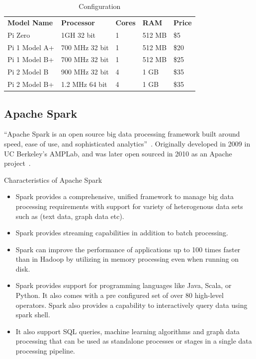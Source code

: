 \begin{table}[]
	\centering \caption{Configuration}\label{t:Different Pi Models}
        \begin{tabular}{lllll} 
        \textbf{Model Name} & \textbf{Processor} 
        & \textbf{Cores} & \textbf{RAM}& \textbf{Price}
        \\ Pi Zero & 1GH 32 bit & 1 & 512 MB & \$5
        \\ Pi 1 Model A+ & 700 MHz 32 bit & 1  & 512 MB & \$20
        \\ Pi 1 Model B+ & 700 MHz 32 bit & 1 & 512 MB & \$25
        \\ Pi 2 Model B & 900 MHz 32 bit & 4 & 1 GB & \$35
        \\ Pi 2 Model B+ & 1.2 MHz 64 bit & 4 & 1 GB & \$35        
        \\
	\end{tabular}
\end{table}

\subsection{Apache Spark}

``Apache Spark is an open source big data processing framework built
around speed, ease of use, and sophisticated
analytics''~\cite{hid-sp18-510-spark}. Originally developed in 2009 in
UC Berkeley’s AMPLab, and was later open sourced in 2010 as an Apache
project~\cite{hid-sp18-510-spark}.

Characteristics of Apache Spark

\begin{itemize}
\item Spark provides a comprehensive, unified framework to manage big
  data processing requirements with support for variety of
  heterogenous data sets such as (text data, graph data etc).
\item Spark provides streaming capabilities in addition to batch
  processing.
\item Spark can improve the performance of applications up to 100
  times faster than in Hadoop by utilizing in memory processing even
  when running on disk.
\item Spark provides support for programming languages like Java,
  Scala, or Python. It also comes with a pre configured set of over 80
  high-level operators. Spark also provides a capability to
  interactively query data using spark shell.
\item It also support SQL queries, machine learning algorithms and
  graph data processing that can be used as standalone processes or
  stages in a single data processing pipeline.
\end{itemize}

